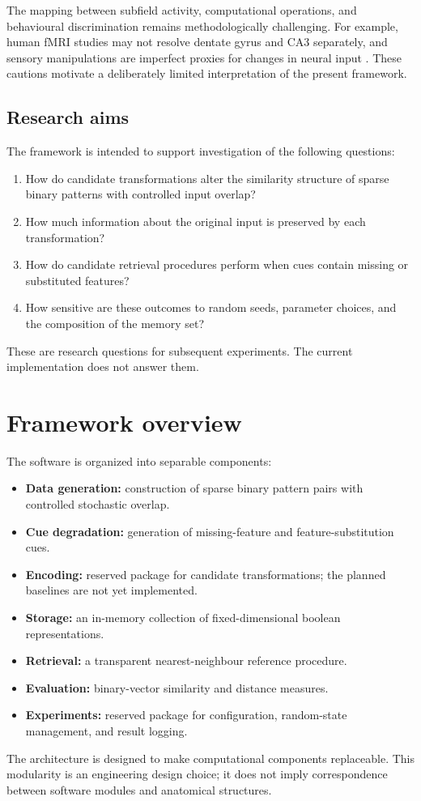 \documentclass[11pt,a4paper]{article}
\begin{document}
The mapping between subfield activity, computational operations, and behavioural discrimination remains methodologically challenging. For example, human fMRI studies may not resolve dentate gyrus and CA3 separately, and sensory manipulations are imperfect proxies for changes in neural input \citep{yassa2011}. These cautions motivate a deliberately limited interpretation of the present framework.

\subsection{Research aims}

The framework is intended to support investigation of the following questions:
\begin{enumerate}
    \item How do candidate transformations alter the similarity structure of sparse binary patterns with controlled input overlap?
    \item How much information about the original input is preserved by each transformation?
    \item How do candidate retrieval procedures perform when cues contain missing or substituted features?
    \item How sensitive are these outcomes to random seeds, parameter choices, and the composition of the memory set?
\end{enumerate}
These are research questions for subsequent experiments. The current implementation does not answer them.

\section{Framework overview}

The software is organized into separable components:
\begin{itemize}
    \item \textbf{Data generation:} construction of sparse binary pattern pairs with controlled stochastic overlap.
    \item \textbf{Cue degradation:} generation of missing-feature and feature-substitution cues.
    \item \textbf{Encoding:} reserved package for candidate transformations; the planned baselines are not yet implemented.
    \item \textbf{Storage:} an in-memory collection of fixed-dimensional boolean representations.
    \item \textbf{Retrieval:} a transparent nearest-neighbour reference procedure.
    \item \textbf{Evaluation:} binary-vector similarity and distance measures.
    \item \textbf{Experiments:} reserved package for configuration, random-state management, and result logging.
\end{itemize}
The architecture is designed to make computational components replaceable. This modularity is an engineering design choice; it does not imply correspondence between software modules and anatomical structures.
\end{document}
